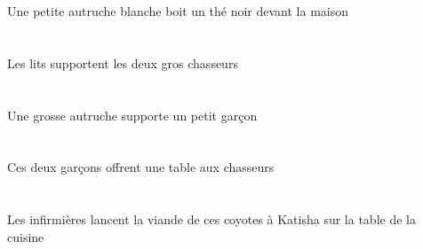 \begin{exe}
Une petite autruche blanche boit un thé noir devant la maison
\ex\glll
\DEFPlErg{}   \litDPlErg{}   \DEFDuAbs{}   \grosCDu{}   \chasseurCDuAbs{}  \supporterVtPrsCDu{}\\
\DEFPlErgP{}   \litDPlErgP{}   \DEFDuAbsP{}   \grosCDuP{}   \chasseurCDuAbsP{}  \supporterVtPrsCDuP{}\\
\DEFPlErgG{}   \litDPlErgG{}   \DEFDuAbsG{}   \grosCDuG{}   \chasseurCDuAbsG{}  \supporterVtPrsCDuG{}\\
Les lits supportent les deux gros chasseurs
\ex\glll
\INDSgErg{}   \grosBSg{}   \autrucheBSgErg{}   \INDSgAbs{}   \petitDSg{}   \garconDSgAbs{}  \supporterVtPrsDSg{}\\
\INDSgErgP{}   \grosBSgP{}   \autrucheBSgErgP{}   \INDSgAbsP{}   \petitDSgP{}   \garconDSgAbsP{}  \supporterVtPrsDSgP{}\\
\INDSgErgG{}   \grosBSgG{}   \autrucheBSgErgG{}   \INDSgAbsG{}   \petitDSgG{}   \garconDSgAbsG{}  \supporterVtPrsDSgG{}\\
Une grosse autruche supporte un petit garçon
\ex\glll
\DEMDuErg{}   \garconDDuErg{}    \DEFPlDat{}   \chasseurCPlDat{}   \INDSgAbs{}   \tableDSgAbs{}  \offrirVdPrsDSg{}\\
\DEMDuErgP{}   \garconDDuErgP{}    \DEFPlDatP{}   \chasseurCPlDatP{}   \INDSgAbsP{}   \tableDSgAbsP{}  \offrirVdPrsDSgP{}\\
\DEMDuErgG{}   \garconDDuErgG{}    \DEFPlDatG{}   \chasseurCPlDatG{}   \INDSgAbsG{}   \tableDSgAbsG{}  \offrirVdPrsDSgG{}\\
Ces deux garçons offrent une table aux chasseurs
\ex\glll
\DEFSgObl{}    \DEFSgObl{}   \cuisineDSgObl{}   \DE{}   \tableDSgObl{}   \SUR{}   \DEFPlErg{}   \infirmiereAPlErg{}    \INDSgDat{}   \KatishaASgDat{}   \DEFSgAbs{}    \DEMPlObl{}   \coyoteCPlObl{}   \DE{}   \viandeASgAbs{}  \lancerVdPrsASg{}\\
\DEFSgOblP{}    \DEFSgOblP{}   \cuisineDSgOblP{}   \DEP{}   \tableDSgOblP{}   \SURP{}   \DEFPlErgP{}   \infirmiereAPlErgP{}    \INDSgDatP{}   \KatishaASgDatP{}   \DEFSgAbsP{}    \DEMPlOblP{}   \coyoteCPlOblP{}   \DEP{}   \viandeASgAbsP{}  \lancerVdPrsASgP{}\\
\DEFSgOblG{}    \DEFSgOblG{}   \cuisineDSgOblG{}   \DEG{}   \tableDSgOblG{}   \SURG{}   \DEFPlErgG{}   \infirmiereAPlErgG{}    \INDSgDatG{}   \KatishaASgDatG{}   \DEFSgAbsG{}    \DEMPlOblG{}   \coyoteCPlOblG{}   \DEG{}   \viandeASgAbsG{}  \lancerVdPrsASgG{}\\
Les infirmières lancent la viande de ces coyotes à Katisha sur la table de la cuisine
\ex\glll

\end{exe}
